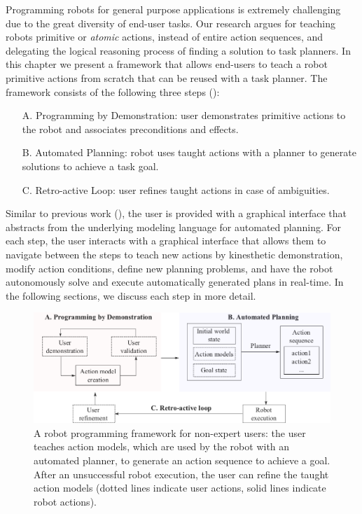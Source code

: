 Programming robots for general purpose applications is extremely challenging due to the great diversity of end-user tasks.
Our research argues for teaching robots primitive or \textit{atomic} actions, instead of entire action sequences, and delegating the logical reasoning process of finding a solution to task planners.
In this chapter we present a framework that allows end-users to teach a robot primitive actions from scratch that can be reused with a task planner.
The framework consists of the following three steps (): 
\begin{enumerate}
	\item[A.]{Programming by Demonstration: user demonstrates primitive actions to the robot and associates preconditions and effects.}
	\item[B.]{Automated Planning: robot uses taught actions with a planner to generate solutions to achieve a task goal.}
	\item[C.]{Retro-active Loop: user refines taught actions in case of ambiguities.}
\end{enumerate}
Similar to previous work (\cite{perzylo2016intuitive}), the user is provided with a graphical interface that abstracts from the underlying modeling language for automated planning.
For each step, the user interacts with a graphical interface that allows them to navigate between the steps to teach new actions by kinesthetic demonstration, modify action conditions, define new planning problems, and have the robot autonomously solve and execute automatically generated plans in real-time.
In the following sections, we discuss each step in more detail. 

\begin{figure}[!h]
	\centering
	\includegraphics[width=\linewidth]{figures/framework.png}
	\caption{A robot programming framework for non-expert users: the user teaches action models, which are used by the robot with an automated planner, to generate an action sequence to achieve a goal.
After an unsuccessful robot execution, the user can refine the taught action models (dotted lines indicate user actions, solid lines indicate robot actions).}
	\label{fig:framework}
\end{figure}

